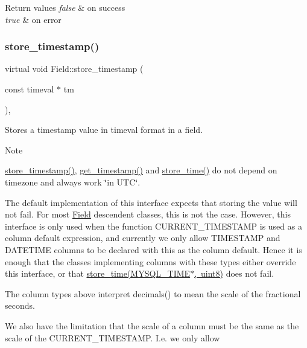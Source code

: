 \begin{DoxyRetVals}{Return values}
{\em false} & on success \\
\hline
{\em true} & on error \\
\hline
\end{DoxyRetVals}
\mbox{\label{classField_aac6a006a51d128f9cf462b6ce1542def}} 
\subsubsection{\texorpdfstring{store\+\_\+timestamp()}{store\_timestamp()}\hspace{0.1cm}{\footnotesize\ttfamily [1/2]}}
{\footnotesize\ttfamily virtual void Field\+::store\+\_\+timestamp (\begin{DoxyParamCaption}\item[{const timeval $\ast$}]{tm }\end{DoxyParamCaption})\hspace{0.3cm}{\ttfamily [inline]}, {\ttfamily [virtual]}}

Stores a timestamp value in timeval format in a field.

\begin{DoxyNote}{Note}

\begin{DoxyItemize}
\item \mbox{\hyperlink{classField_aac6a006a51d128f9cf462b6ce1542def}{store\+\_\+timestamp()}}, \mbox{\hyperlink{classField_ac6b92691afad064d5f80b762a39c0e7f}{get\+\_\+timestamp()}} and \mbox{\hyperlink{classField_a7433aa07355def6c394687567256e6cf}{store\+\_\+time()}} do not depend on timezone and always work \char`\"{}in U\+T\+C\char`\"{}.
\item The default implementation of this interface expects that storing the value will not fail. For most \mbox{\hyperlink{classField}{Field}} descendent classes, this is not the case. However, this interface is only used when the function C\+U\+R\+R\+E\+N\+T\+\_\+\+T\+I\+M\+E\+S\+T\+A\+MP is used as a column default expression, and currently we only allow T\+I\+M\+E\+S\+T\+A\+MP and D\+A\+T\+E\+T\+I\+ME columns to be declared with this as the column default. Hence it is enough that the classes implementing columns with these types either override this interface, or that \mbox{\hyperlink{classField_a7433aa07355def6c394687567256e6cf}{store\+\_\+time(\+M\+Y\+S\+Q\+L\+\_\+\+T\+I\+M\+E$\ast$, uint8)}} does not fail.
\item The column types above interpret decimals() to mean the scale of the fractional seconds.
\item We also have the limitation that the scale of a column must be the same as the scale of the C\+U\+R\+R\+E\+N\+T\+\_\+\+T\+I\+M\+E\+S\+T\+A\+MP. I.\+e. we only allow
\end{DoxyItemize}
\end{DoxyNote}

